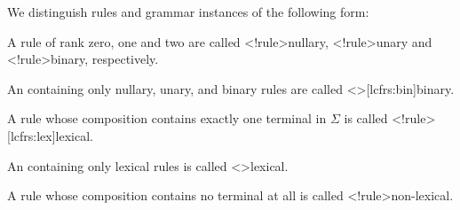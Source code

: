 \documentclass[../../document.tex]{subfiles}
\begin{document}
    \begin{definition}We distinguish rules and grammar instances of the following form:
        \begin{compactitem}
            \item A rule of rank zero, one and two are called <\lcfrs!rule>{nullary}, <\lcfrs!rule>{unary} and <\lcfrs!rule>{binary}, respectively.
            \item An  containing only nullary, unary, and binary rules are called <\lcfrs>[lcfrs:bin]{binary}.
            \item A rule whose composition contains exactly one terminal in \(\varSigma\) is called <\lcfrs!rule>[lcfrs:lex]{lexical}.
            \item An  containing only lexical rules is called <\lcfrs>{lexical}.
            \item A rule whose composition contains no terminal at all is called <\lcfrs!rule>{non-lexical}.
        \end{compactitem}
    \end{definition}
\end{document}
